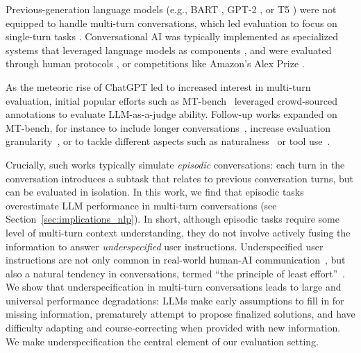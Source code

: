 \documentclass{article}
\begin{document}

Previous-generation language models (e.g., BART \cite{lewis2019bart}, GPT-2 \cite{radford2019language}, or T5 \cite{raffel2020exploring}) were not equipped to handle multi-turn conversations, which led evaluation to focus on single-turn tasks \cite{wang2018glue}. Conversational AI was typically implemented as specialized systems that leveraged language models as components \cite{konrad2021alquist}, and were evaluated through human protocols \cite{deriu2021survey,lee2022evaluating,finch2023don,murakhovs2023salespeople}, or competitions like Amazon's Alex Prize \cite{ram2018conversational}.

As the meteoric rise of ChatGPT led to increased interest in multi-turn evaluation, initial popular efforts such as MT-bench~\cite{zheng2023judging} leveraged crowd-sourced annotations to evaluate LLM-as-a-judge ability.
Follow-up works expanded on MT-bench, for instance to include longer conversations~\cite{kwan2024mt,duan2024botchat}, increase evaluation granularity~\cite{bai2024mt}, or to tackle different aspects such as naturalness~\cite{sirdeshmukh2025multichallenge} or tool use~\cite{2024bfcl,wang2024mint}.

Crucially, such works typically simulate \textit{episodic} conversations: each turn in the conversation introduces a subtask that relates to previous conversation turns, but can be evaluated in isolation.
In this work, we find that episodic tasks overestimate LLM performance in multi-turn conversations (see Section~\ref{sec:implications_nlp}).
In short, although episodic tasks require some level of multi-turn context understanding, they do not involve actively fusing the information to answer \textit{underspecified} user instructions.
Underspecified user instructions are not only common in real-world human-AI communication~\cite{herlihy2024overcoming}, but also a natural tendency in conversations, termed ``the principle of least effort''~\cite{zipf1949human}.
We show that underspecification in multi-turn conversations leads to large and universal performance degradations: LLMs make early assumptions to fill in for missing information, prematurely attempt to propose finalized solutions, and have difficulty adapting and course-correcting when provided with new information.
We make underspecification the central element of our evaluation setting.

\end{document}

